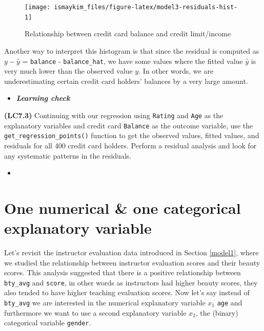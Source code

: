 \documentclass[12pt,]{krantz}
\newenvironment{rmdblock}[1]
  {\begin{shaded*}
  \begin{itemize}
  \renewcommand{\labelitemi}{
    \raisebox{-.7\height}[0pt][0pt]{
    }
  }
  \item
  }
  {
  \end{itemize}
  \end{shaded*}
  }
\newenvironment{learncheck}
  {\begin{rmdblock}{warning}}
  {\end{rmdblock}}
\begin{document}
\begin{figure}

{\centering \texttt{[image: ismaykim\_files/figure-latex/model3-residuals-hist-1]} 

}

\caption{Relationship between credit card balance and credit limit/income}\label{fig:model3-residuals-hist}
\end{figure}

Another way to interpret this histogram is that since the residual is
computed as \(y - \widehat{y}\) = \texttt{balance} -
\texttt{balance\_hat}, we have some values where the fitted value
\(\widehat{y}\) is very much lower than the observed value \(y\). In
other words, we are underestimating certain credit card holders'
balances by a very large amount.

\begin{learncheck}
\textbf{\emph{Learning check}}
\end{learncheck}

\textbf{(LC7.3)} Continuing with our regression using \texttt{Rating}
and \texttt{Age} as the explanatory variables and credit card
\texttt{Balance} as the outcome variable, use the
\texttt{get\_regression\_points()} function to get the observed values,
fitted values, and residuals for all 400 credit card holders. Perform a
residual analysis and look for any systematic patterns in the residuals.

\begin{learncheck}

\end{learncheck}

\section{One numerical \& one categorical explanatory
variable}\label{model4}

Let's revisit the instructor evaluation data introduced in Section
\ref{model1}, where we studied the relationship between instructor
evaluation scores and their beauty scores. This analysis suggested that
there is a positive relationship between \texttt{bty\_avg} and
\texttt{score}, in other words as instructors had higher beauty scores,
they also tended to have higher teaching evaluation scores. Now let's
say instead of \texttt{bty\_avg} we are interested in the numerical
explanatory variable \(x_1\) \texttt{age} and furthermore we want to use
a second explanatory variable \(x_2\), the (binary) categorical variable
\texttt{gender}.
\end{document}
